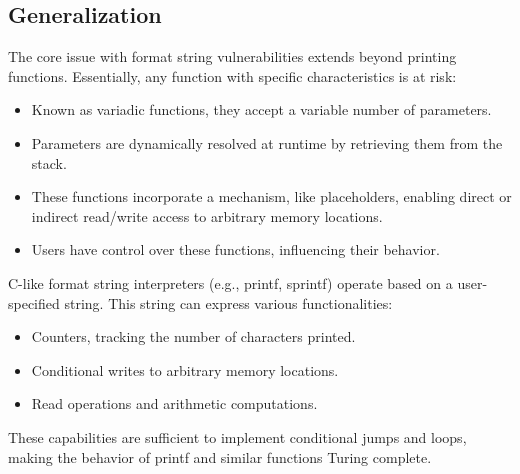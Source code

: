 \subsection{Generalization}
The core issue with format string vulnerabilities extends beyond printing functions. 
Essentially, any function with specific characteristics is at risk:
\begin{itemize}
    \item Known as variadic functions, they accept a variable number of parameters.
    \item Parameters are dynamically resolved at runtime by retrieving them from the stack.
    \item These functions incorporate a mechanism, like placeholders, enabling direct or indirect read/write access to arbitrary memory locations.
    \item Users have control over these functions, influencing their behavior.
\end{itemize}
C-like format string interpreters (e.g., printf, sprintf) operate based on a user-specified string. This string can express various functionalities:
\begin{itemize}
    \item Counters, tracking the number of characters printed.
    \item Conditional writes to arbitrary memory locations.
    \item Read operations and arithmetic computations.
\end{itemize}
These capabilities are sufficient to implement conditional jumps and loops, making the behavior of printf and similar functions Turing complete.